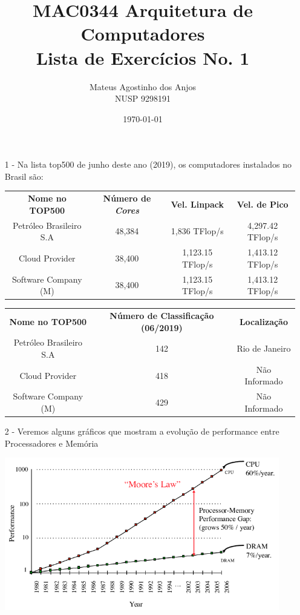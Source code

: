 \documentclass[12pt]{article}
\title{MAC0344 Arquitetura de Computadores\\
Lista de Exercícios No. 1
}
\author{Mateus Agostinho dos Anjos\\NUSP 9298191}
\date{\today}
\begin{document}
	\maketitle
	\begin{itemize}
		\item[1 -]
			Na lista top500 de junho deste ano (2019), os
			computadores instalados no Brasil são:\\
			\begin{table}[h]
				\begin{tabular}{c|c|c|c}
					\textbf{Nome no TOP500} & \textbf{Número de \textit{Cores}} & \textbf{Vel. Linpack} & \textbf{Vel. de Pico}\\
					Petróleo Brasileiro S.A & 48,384 & 1,836 TFlop/s & 4,297.42 TFlop/s\\
					Cloud Provider & 38,400 & 1,123.15 TFlop/s & 1,413.12 TFlop/s\\
					Software Company (M) & 38,400 & 1,123.15 TFlop/s& 1,413.12 TFlop/s\\
				\end{tabular}
			\end{table}
					\begin{table}[h]
				\begin{tabular}{c|c|c}
					\textbf{Nome no TOP500} & \textbf{Número de Classificação (06/2019)} & \textbf{Localização}\\
					Petróleo Brasileiro S.A & 142 & Rio de Janeiro\\
					Cloud Provider & 418 & Não Informado\\
					Software Company (M) & 429 & Não Informado\\
				\end{tabular}
			\end{table}
			\newpage	
		\item[2 -]
			Veremos alguns gráficos que mostram a evolução de performance
			entre Processadores e Memória
			\hfill\newline
			\begin{minipage}{\linewidth}
				\centering
  				\includegraphics[width=12cm]{Memory-Access-vs-CPU-Speed.png}

\end{minipage}
\end{itemize}
\end{document}
